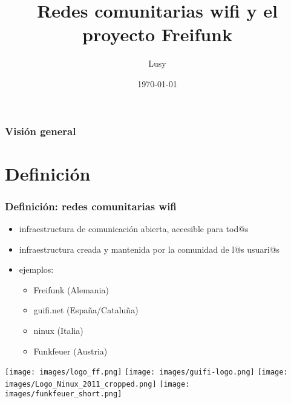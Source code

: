 \documentclass[12pt, xcolor=table]{beamer}
\begin{document}
\title{Redes comunitarias wifi y el proyecto Freifunk}
\author{Lusy}
\date{\today}


\begin{frame}
  \maketitle
\end{frame}

\begin{frame}
    \frametitle{Visión general}
    \tableofcontents
\end{frame}

\section{Definición}
\begin{frame}
  \frametitle{Definición: redes comunitarias wifi}
    \begin{itemize}
      \item infraestructura de comunicación abierta, accesible para tod@s
      \item infraestructura creada y mantenida por la comunidad de l@s usuari@s
      \item ejemplos:
        \begin{itemize}
          \item Freifunk (Alemania)
          \item guifi.net (España/Cataluña)
          \item ninux (Italia)
          \item Funkfeuer (Austria)
        \end{itemize}
    \end{itemize}
    \texttt{[image: images/logo\_ff.png]}
    \hspace{6pt}
    \texttt{[image: images/guifi-logo.png]}
    \hspace{6pt}
    \texttt{[image: images/Logo\_Ninux\_2011\_cropped.png]}
    \hspace{6pt}
    \texttt{[image: images/funkfeuer\_short.png]}
\end{frame}
\end{document}

